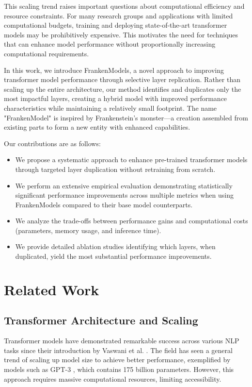 \documentclass[conference]{IEEEtran}
\begin{document}
This scaling trend raises important questions about computational efficiency and resource constraints. For many research groups and applications with limited computational budgets, training and deploying state-of-the-art transformer models may be prohibitively expensive. This motivates the need for techniques that can enhance model performance without proportionally increasing computational requirements.

In this work, we introduce FrankenModels, a novel approach to improving transformer model performance through selective layer replication. Rather than scaling up the entire architecture, our method identifies and duplicates only the most impactful layers, creating a hybrid model with improved performance characteristics while maintaining a relatively small footprint. The name "FrankenModel" is inspired by Frankenstein's monster—a creation assembled from existing parts to form a new entity with enhanced capabilities.

Our contributions are as follows:
\begin{itemize}
    \item We propose a systematic approach to enhance pre-trained transformer models through targeted layer duplication without retraining from scratch.
    \item We perform an extensive empirical evaluation demonstrating statistically significant performance improvements across multiple metrics when using FrankenModels compared to their base model counterparts.
    \item We analyze the trade-offs between performance gains and computational costs (parameters, memory usage, and inference time).
    \item We provide detailed ablation studies identifying which layers, when duplicated, yield the most substantial performance improvements.
\end{itemize}

\section{Related Work}

\subsection{Transformer Architecture and Scaling}
Transformer models have demonstrated remarkable success across various NLP tasks since their introduction by Vaswani et al. \cite{vaswani2017attention}. The field has seen a general trend of scaling up model size to achieve better performance, exemplified by models such as GPT-3 \cite{brown2020language}, which contains 175 billion parameters. However, this approach requires massive computational resources, limiting accessibility.
\end{document}
